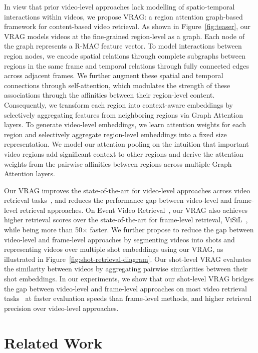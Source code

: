 \documentclass[letterpaper]{article} \usepackage{aaai22}  \usepackage{times}  \usepackage{helvet}  \usepackage{courier}  \usepackage[hyphens]{url}  \usepackage{graphicx} \urlstyle{rm} \usepackage{amsmath}
\begin{document}
In view that prior video-level approaches lack modelling of spatio-temporal interactions within videos, we propose VRAG: a region attention graph-based framework for content-based video retrieval. As shown in Figure~\ref{fig:teaser}, our VRAG models videos at the fine-grained region-level as a graph. Each node of the graph represents a R-MAC feature vector. To model interactions between region nodes, we encode spatial relations through complete subgraphs between regions in the same frame and temporal relations through fully connected edges across adjacent frames. We further augment these spatial and temporal connections through self-attention, which modulates the strength of these associations through the affinities between their region-level content. Consequently, we transform each region into context-aware embeddings by selectively aggregating features from neighboring regions via Graph Attention~\cite{graph-attention} layers. To generate video-level embeddings, we learn attention weights for each region and selectively aggregate region-level embeddings into a fixed size representation. We model our attention pooling on the intuition that important video regions add significant context to other regions and derive the attention weights from the pairwise affinities between regions across multiple Graph Attention layers. 

Our VRAG improves the state-of-the-art for video-level approaches across video retrieval tasks~\cite{dataset:fivr200k, dataset:evve, dataset:cc-web-video}, and reduces the performance gap between video-level and frame-level retrieval approaches. On Event Video Retrieval~\cite{dataset:evve}, our VRAG also achieves higher retrieval scores over the state-of-the-art for frame-level retrieval, ViSiL~\cite{kordopatiszilos2019visil}, while being more than 50$\times$ faster. We further propose to reduce the gap between video-level and frame-level approaches by segmenting videos into shots and representing videos over multiple shot embeddings using our VRAG, as illustrated in Figure~\ref{fig:shot-retrieval-diagram}. Our shot-level VRAG evaluates the similarity between videos by aggregating pairwise similarities between their shot embeddings. In our experiments, we show that our shot-level VRAG bridges the gap between video-level and frame-level approaches on most video retrieval tasks~\cite{dataset:fivr200k, dataset:cc-web-video}
at faster evaluation speeds than frame-level methods, and higher retrieval precision over video-level approaches. 

\section{Related Work}
\end{document}
